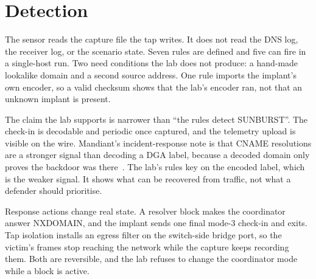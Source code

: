 \section{Detection}
\label{sec:detection}

The sensor reads the capture file the tap writes. It does not read the DNS log, the receiver log, or the scenario state. Seven rules are defined and five can fire in a single-host run. Two need conditions the lab does not produce: a hand-made lookalike domain and a second source address. One rule imports the implant's own encoder, so a valid checksum shows that the lab's encoder ran, not that an unknown implant is present.

The claim the lab supports is narrower than ``the rules detect SUNBURST''. The check-in is decodable and periodic once captured, and the telemetry upload is visible on the wire. Mandiant's incident-response note is that CNAME resolutions are a stronger signal than decoding a DGA label, because a decoded domain only proves the backdoor was there~\cite{mandiant-sunburst-details}. The lab's rules key on the encoded label, which is the weaker signal. It shows what can be recovered from traffic, not what a defender should prioritise.

Response actions change real state. A resolver block makes the coordinator answer NXDOMAIN, and the implant sends one final mode-3 check-in and exits. Tap isolation installs an egress filter on the switch-side bridge port, so the victim's frames stop reaching the network while the capture keeps recording them. Both are reversible, and the lab refuses to change the coordinator mode while a block is active.
